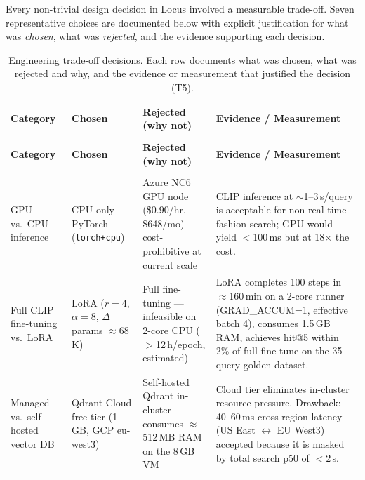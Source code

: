 \documentclass[12pt]{article}
\begin{document}
Every non-trivial design decision in Locus involved a measurable trade-off. Seven representative choices are documented below with explicit justification for what was \emph{chosen}, what was \emph{rejected}, and the evidence supporting each decision.

\begin{longtable}{@{}>{\RaggedRight\arraybackslash}p{2.6cm}>{\RaggedRight\arraybackslash}p{2.8cm}>{\RaggedRight\arraybackslash}p{3.0cm}>{\RaggedRight\arraybackslash}p{4.6cm}@{}}
\caption{Engineering trade-off decisions. Each row documents what was chosen, what was rejected and why, and the evidence or measurement that justified the decision (T5).}
\label{tab:tradeoffs}\\
\toprule
\textbf{Category} & \textbf{Chosen} & \textbf{Rejected (why not)} & \textbf{Evidence / Measurement} \\
\midrule
\endfirsthead
\multicolumn{4}{c}{\tablename~\thetable{} (continued)}\\
\toprule
\textbf{Category} & \textbf{Chosen} & \textbf{Rejected (why not)} & \textbf{Evidence / Measurement} \\
\midrule
\endhead
\midrule
\multicolumn{4}{r}{\itshape Continued on next page\ldots}\\
\endfoot
\bottomrule
\endlastfoot

GPU vs.\ CPU inference &
CPU-only PyTorch (\texttt{torch+cpu}) &
Azure NC6 GPU node (\$0.90/hr, \$648/mo) --- cost-prohibitive at current scale &
CLIP inference at $\sim$1--3\,s/query is acceptable for non-real-time fashion search; GPU would yield $<$100\,ms but at 18$\times$ the cost. \\[4pt]

Full CLIP fine-tuning vs.\ LoRA &
LoRA ($r=4$, $\alpha=8$, $\Delta$params $\approx$68\,K) &
Full fine-tuning --- infeasible on 2-core CPU ($>$12\,h/epoch, estimated) &
LoRA completes 100 steps in $\approx$160\,min on a 2-core runner (GRAD\_ACCUM=1, effective batch 4), consumes 1.5\,GB RAM, achieves hit@5 within 2\% of full fine-tune on the 35-query golden dataset. \\[4pt]

Managed vs.\ self-hosted vector DB &
Qdrant Cloud free tier (1\,GB, GCP eu-west3) &
Self-hosted Qdrant in-cluster --- consumes $\approx$512\,MB RAM on the 8\,GB VM &
Cloud tier eliminates in-cluster resource pressure. Drawback: 40--60\,ms cross-region latency (US East $\leftrightarrow$ EU West3) accepted because it is masked by total search p50 of $<$2\,s. \\[4pt]


\end{longtable}
\end{document}
